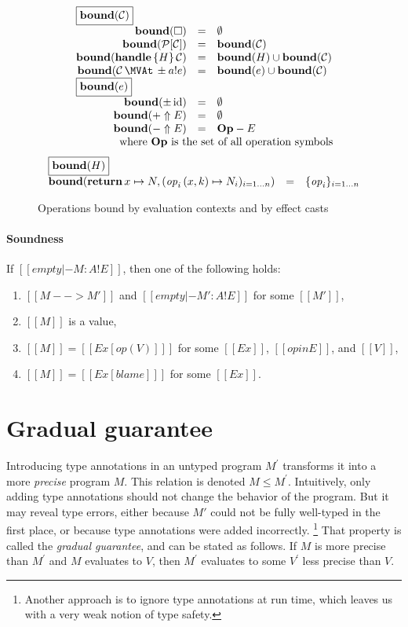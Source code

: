\begin{figure}
\[
\begin{array}{rcl}
\multicolumn{3}{l}{\fbox{$\bound{\xC}$}} \\
  \bound{\square} & = & \emptyset \\
  \bound{\context{\xP}{\xC}} & = & \bound{\xC} \\
  \bound{\handle{H}{\xC}} & = & \bound{H} \cup \bound{\xC} \\
  \bound{\cast{\xC}{\pm \cty{e}{a}}} & = & \bound{e} \cup \bound{\xC} \\
\multicolumn{3}{l}{\fbox{$\bound{e}$}} \\
  \bound{\pm\, \cid} & = & \emptyset \\
  \bound{+ \Uparrow E} & = & \emptyset \\
  \bound{- \Uparrow E} & = & \mathbf{Op} - E \\
  && \quad \makebox[0pt]{\text{where $\mathbf{Op}$ is the set of all operation symbols} }
\end{array}
\]
\[
\begin{array}{rcl}
\multicolumn{3}{l}{\fbox{$\bound{H}$}} \\
  \bound{\treturn{x}\mapsto N, \fori{i}{n}{\perform{\effop_i}{x,k} \mapsto N_i}}
    &=& \foriset{i}{n}{\effop_i}
\end{array}
\]
\caption{Operations bound by evaluation contexts and by effect casts}
\end{figure}

\paragraph{Soundness} If $[[empty |- M : A ! E]]$, then one of the following holds:
\begin{enumerate}
 \item $[[M --> M']]$ and $[[empty |- M' : A ! E]]$ for some $[[M']]$,
 \item $[[M]]$ is a value,
 \item $[[M]] = [[Ex [ op ( V ) ] ]]$ for some $[[Ex]]$, $[[op in E]]$, and $[[V]]$,
 \item $[[M]] = [[Ex [ blame ] ]]$ for some $[[Ex]]$.
\end{enumerate}

\section{Gradual guarantee}

Introducing type annotations in an untyped program $M^\prime$ transforms it into a more \emph{precise} program $M$.
This relation is denoted $M \le M^\prime$.
Intuitively, only adding type annotations should not change the behavior of the program.
But it may reveal type errors, either because $M'$ could not be fully well-typed
in the first place, or because type annotations were added incorrectly.
\footnote{Another approach is to ignore type annotations at run time, which leaves us with a very weak notion of type safety.}
That property is called the \emph{gradual guarantee}, and can be stated as follows.
If $M$ is more precise than $M^\prime$ and $M$ evaluates to $V$,
then $M^\prime$ evaluates to some $V^\prime$ less precise than $V$.

